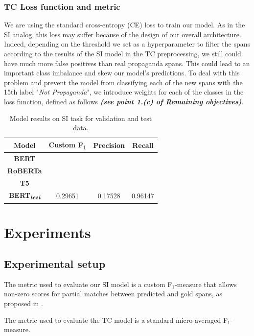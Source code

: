 \documentclass[11pt]{article}
\newcommand{\pol}[1]{{\fontfamily{pcr}\selectfont#1}}
\begin{document}
\subsubsection{\pol{TC} Loss function and metric}
We are using the standard cross-entropy (CE) loss to train our model. As in the \pol{SI} analog, this loss may suffer because of the design of our overall architecture. Indeed, depending on the threshold we set as a hyperparameter to filter the spans according to the results of the \pol{SI} model in the \pol{TC} preprocessing, we still could have much more false positives than real propaganda spans. This could lead to an important class imbalance and skew our model's predictions. To deal with this problem and prevent the model from classifying each of the new spans with the 15th label "\textit{Not Propaganda}", we introduce weights for each of the classes in the loss function, defined as follows {\textbf{\textit{(see point 1.(c) of Remaining objectives)}}}.

\begin{table}[t]
\centering
  \begin{tabular}{|c|c c c|}
    \hline
    \textbf{Model} & \textbf{Custom F\textsubscript{1}} & \textbf{Precision} & \textbf{Recall} \\
    \hline
    \pol{\textbf{BERT}} & & & \\
    \pol{\textbf{RoBERTa}} & & & \\ 
    \pol{\textbf{T5}} & & & \\
    \hline
    \textbf{\pol{BERT}\textsubscript{\textit{test}}}  & 0.29651 & 0.17528 & 0.96147\\
    \hline
  \end{tabular}
  \caption{Model results on \pol{SI} task for validation and test data.}
    \label{table:si-results}
\end{table}

\section{Experiments}
\subsection{Experimental setup}
The metric used to evaluate our \pol{SI} model is a custom F$_1$-measure that allows non-zero scores for partial matches between predicted and gold spans, as proposed in \cite{semeval}. 

The metric used to evaluate the \pol{TC} model is a standard micro-averaged F$_1$-measure.
\end{document}
